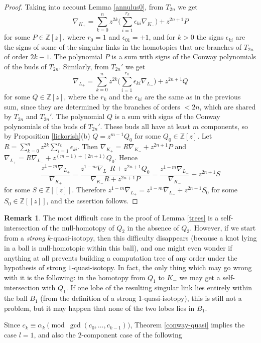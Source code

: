 \documentclass[a4paper,12pt,reqno,oneside]{amsart} %
\theoremstyle{plain}
\theoremstyle{definition}
\newtheorem{remark}[theorem]{Remark}
\theoremstyle{named}
\renewcommand{\:}{\colon}
\def\Z{\mathbb{Z}}
\begin{document}
\begin{proof}
Taking into account Lemma \ref{annulus0}, from $T_{2n}$ we get 
\[\nabla_{K_+}=\sum_{k=0}^n z^{2k}\Big(\sum_{i=1}^{r_k}\epsilon_{ki}\nabla_{K_-}\Big)+z^{2n+1}P\] for some $P\in\Z[z]$, 
where $r_0=1$ and $\epsilon_{01}=+1$, and for $k>0$ the signs $\epsilon_{ki}$ are the signs of some of the singular links in the homotopies 
that are branches of $T_{2n}$ of order $2k-1$.
The polynomial $P$ is a sum with signs of the Conway polynomials of the buds of $T_{2n}$.
Similarly, from $T_{2n}'$ we get \[\nabla_{L_+}=\sum_{k=0}^n z^{2k}\Big(\sum_{i=1}^{r_k}\epsilon_{ki}\nabla_{L_-}\Big)+z^{2n+1}Q\] 
for some $Q\in\Z[z]$, 
where the $r_k$ and the $\epsilon_{ki}$ are the same as in the previous sum, since they are determined by the branches of orders $<2n$, which are
shared by $T_{2n}$ and $T_{2n}'$.
The polynomial $Q$ is a sum with signs of the Conway polynomials of the buds of $T_{2n}'$.
These buds all have at least $m$ components, so by Proposition \ref{lickorish}(b) $Q=z^{m-1}Q_0$ for some $Q_0\in\Z[z]$.
Let $R=\sum_{k=0}^n z^{2k}\sum_{i=1}^{r_k}\epsilon_{ki}$.
Then $\nabla_{K_+}=R\nabla_{K_-}+z^{2n+1}P$ and $\nabla_{L_+}=R\nabla_{L_-}+z^{(m-1)+(2n+1)}Q_0$.
Hence
\[\frac{z^{1-m}\nabla_{L_+}}{\nabla_{K_+}}=
\frac{z^{1-m}\nabla_{L_-}R+z^{2n+1}Q_0}{\nabla_{K_-}R+z^{2n+1}P}=
\frac{z^{1-m}\nabla_{L_-}}{\nabla_{K_-}}+z^{2n+1}S\]
for some $S\in\Z[[z]]$.
Therefore $z^{1-m}\bar\nabla_{L_+}=z^{1-m}\bar\nabla_{L_-}+z^{2n+1}S_0$ for some $S_0\in\Z[[z]]$, and the assertion follows.
\end{proof}

\begin{remark} \label{conway-quasi-discussion} 
The most difficult case in the proof of Lemma \ref{trees} is a self-intersection of the null-homotopy of $Q_2$
in the absence of $Q_3$.
However, if we start from a {\it strong} $k$-quasi-isotopy, then this difficulty disappears (because a knot lying in a ball 
is null-homotopic within this ball), and one might even wonder if anything at all prevents building a computation tree of 
any order under the hypothesis of strong $1$-quasi-isotopy.
In fact, the only thing which may go wrong with it is the following: in the homotopy from $Q_1$ to $K_-$ we may get 
a self-intersection with $Q_1$.
If one lobe of the resulting singular link lies entirely within the ball $B_1$ (from the definition of a strong $1$-quasi-isotopy),
this is still not a problem, but it may happen that none of the two lobes lies in $B_1$.
\end{remark}

Since $c_k\equiv\alpha_k\pmod{\gcd(c_0,\dots,c_{k-1})}$, Theorem \ref{conway-quasi} implies the case $l=1$, and also 
the $2$-component case of the following
\end{document}
